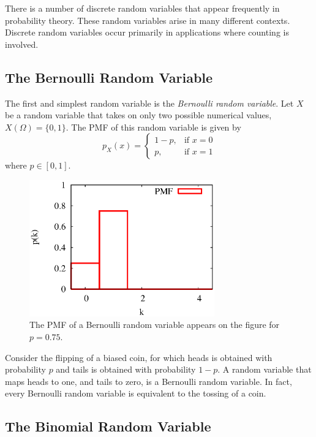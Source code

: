 There is a number of discrete random variables that appear frequently in probability theory.
These random variables arise in many different contexts.
Discrete random variables occur primarily in applications where counting is involved.

\subsection{The Bernoulli Random Variable}

The first and simplest random variable is the \emph{Bernoulli random variable}.
Let $X$ be a random variable that takes on only two possible numerical values, $X(\Omega) = \{0, 1\}$.
The PMF of this random variable is given by
\begin{equation*}
p_X (x) = \left\{ \begin{array}{ll}
1 - p, & \text{if }x = 0 \\
p, & \text{if }x = 1
\end{array} \right.
\end{equation*}
where $p \in [0, 1]$.

\begin{figure}[ht]
\begin{center}
\includegraphics[width=8cm]{Figures/5chapter/bernoulli}
\end{center}
\caption{The PMF of a Bernoulli random variable appears on the figure for $p = 0.75$.}
\end{figure}

\begin{example}
Consider the flipping of a biased coin, for which heads is obtained with probability $p$ and tails is obtained with probability $1-p$.
A random variable that maps heads to one, and tails to zero, is a Bernoulli random variable.
In fact, every Bernoulli random variable is equivalent to the tossing of a coin.
\end{example}


\subsection{The Binomial Random Variable}

